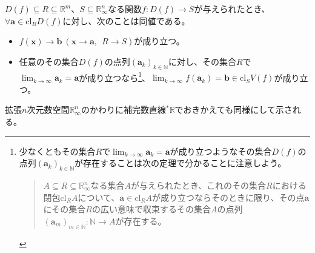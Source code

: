 \documentclass[dvipdfmx]{jsarticle}
\begin{document}
\begin{thm}\label{4.1.10.2}
$D(f) \subseteq R \subseteq \mathbb{R}^{m}$、$S \subseteq \mathbb{R}_{\infty}^{n}$なる関数$f:D(f) \rightarrow S$が与えられたとき、$\forall\mathbf{a} \in \mathrm{cl}_{R}{D(f)}$に対し、次のことは同値である。
\begin{itemize}
\item
  $f\left( \mathbf{x} \right) \rightarrow \mathbf{b}\ \left( \mathbf{x} \rightarrow \mathbf{a},\ \ R \rightarrow S \right)$が成り立つ。
\item
  任意のその集合$D(f)$の点列$\left( \mathbf{a}_{k} \right)_{k \in \mathbb{N}}$に対し、その集合$R$で$\lim_{k \rightarrow \infty}\mathbf{a}_{k} = \mathbf{a}$が成り立つなら\footnote{少なくともその集合$R$で$\lim_{k \rightarrow \infty}\mathbf{a}_{k} = \mathbf{a}$が成り立つようなその集合$D(f)$の点列$\left( \mathbf{a}_{k} \right)_{k \in \mathbb{N}}$が存在することは次の定理で分かることに注意しよう。
\begin{quote}
  $A \subseteq R \subseteq \mathbb{R}_{\infty}^{n}$なる集合$A$が与えられたとき、これのその集合$R$における閉包$\mathrm{cl}_{R}A$について、$\mathbf{a} \in \mathrm{cl}_{R}A$が成り立つならそのときに限り、その点$\mathbf{a}$にその集合$R$の広い意味で収束するその集合$A$の点列$\left( \mathbf{a}_{m} \right)_{m \in \mathbb{N}}:\mathbb{N} \rightarrow A$が存在する。
\end{quote}
}、$\lim_{k \rightarrow \infty}{f\left( \mathbf{a}_{k} \right)} = \mathbf{b} \in \mathrm{cl}_{S}{V(f)}$が成り立つ。
\end{itemize}\par
拡張$n$次元数空間$\mathbb{R}_{\infty}^{n}$のかわりに補完数直線${}^{*}\mathbb{R}$でおきかえても同様にして示される。
\end{thm}
\end{document}

